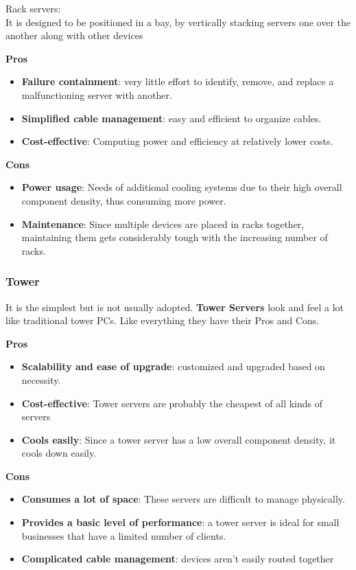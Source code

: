 \documentclass[10pt, oneside]{article}
\begin{document}
Rack servers:\\
It is designed to be positioned in a bay, by vertically stacking servers one over the another along with other devices
\begin{multicols}{2}
\noindent
{\bf \color{green}Pros}\color{black}
\begin{itemize}
    \item {\bf Failure containment}: very little effort to identify, remove, and replace a malfunctioning server with another.
    \item {\bf Simplified cable management}: easy
and efficient to organize cables.
    \item {\bf Cost-effective}: Computing power and efficiency at relatively lower costs.
\end{itemize}
\columnbreak
\noindent
{\bf \color{red}Cons}\color{black}
\begin{itemize}
    \item {\bf Power usage}: Needs of additional cooling systems due to their high overall component density, thus consuming more power.
    \item {\bf Maintenance}: Since multiple devices are placed in racks together, maintaining them gets considerably tough with the increasing number of racks.
\end{itemize}
\end{multicols}



\subsubsection{Tower}
It is the simplest but is not usually adopted.
\textbf{Tower Servers}
look and feel a lot like traditional tower PCs.
Like everything they have their Pros and Cons.
\begin{multicols}{2}
\noindent
{\bf \color{green}Pros}\color{black}
\begin{itemize}
    \item {\bf Scalability and ease of upgrade}: customized and upgraded based on necessity.
    \item {\bf Cost-effective}: Tower servers are probably the cheapest of all kinds of servers
    \item {\bf Cools easily}: Since a tower server has a low overall component density, it cools down easily.
\end{itemize}
\columnbreak
\noindent
{\bf \color{red}Cons}\color{black}
\begin{itemize}
    \item {\bf Consumes a lot of space}: These servers are difficult to manage physically.
    \item {\bf Provides a basic level of performance}: a tower server is ideal for small businesses that have a limited number of clients.
    \item {\bf Complicated cable management}: devices aren't easily routed together
\end{itemize}
\end{multicols}
\end{document}
